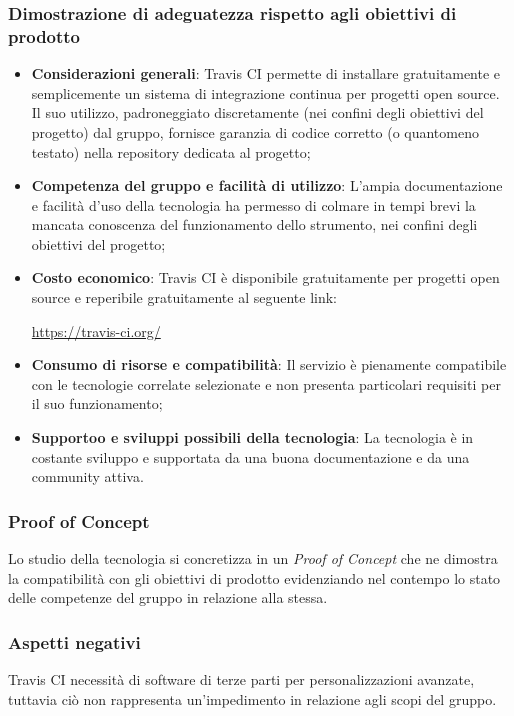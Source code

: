 \documentclass[./../Technology Baseline.tex]{subfiles}
\begin{document}
\subsubsection{Dimostrazione di adeguatezza rispetto agli obiettivi di prodotto}
\begin{itemize}
	\item \textbf{Considerazioni generali}: Travis CI permette di installare gratuitamente e semplicemente un sistema di integrazione continua per progetti open source. Il suo utilizzo, padroneggiato discretamente (nei confini degli obiettivi del progetto) dal gruppo, fornisce garanzia di codice corretto (o quantomeno testato) nella repository dedicata al progetto;
	\item \textbf{Competenza del gruppo e facilità di utilizzo}: L'ampia documentazione e facilità d'uso della tecnologia ha permesso di colmare in tempi brevi la mancata conoscenza del funzionamento dello strumento, nei confini degli obiettivi del progetto;
	\item \textbf{Costo economico}: Travis CI è disponibile gratuitamente per progetti open source e reperibile gratuitamente al seguente link:
	\begin{center}
		\url{https://travis-ci.org/}
	\end{center}
	\item \textbf{Consumo di risorse e compatibilità}: Il servizio è pienamente compatibile con le tecnologie correlate selezionate e non presenta particolari requisiti per il suo funzionamento;
	\item \textbf{Supportoo e sviluppi possibili della tecnologia}: La tecnologia è in costante sviluppo e supportata da una buona documentazione e da una community attiva.
\end{itemize}
\subsubsection{Proof of Concept}
Lo studio della tecnologia si concretizza in un \textit{Proof of Concept} che ne dimostra la compatibilità con gli obiettivi di prodotto evidenziando nel contempo lo stato delle competenze del gruppo in relazione alla stessa.

\subsubsection{Aspetti negativi}
Travis CI necessità di software di terze parti per personalizzazioni avanzate, tuttavia ciò non rappresenta un'impedimento in relazione agli scopi del gruppo. 
\end{document}
